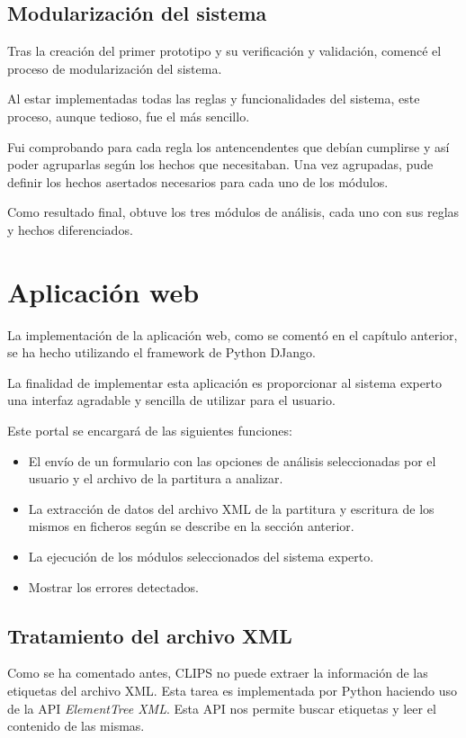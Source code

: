 \subsection{Modularización del sistema}

Tras la creación del primer prototipo y su verificación y validación, comencé el proceso de modularización del sistema. 

Al estar implementadas todas las reglas y funcionalidades del sistema, este proceso, aunque tedioso, fue el más sencillo. 

Fui comprobando para cada regla los antencendentes que debían cumplirse y así poder agruparlas según los hechos que necesitaban.
Una vez agrupadas, pude definir los hechos asertados necesarios para cada uno de los módulos.

Como resultado final, obtuve los tres módulos de análisis, cada uno con sus reglas y hechos diferenciados. 

\section{Aplicación web}

La implementación de la aplicación web, como se comentó en el capítulo anterior, se ha hecho utilizando el framework de Python DJango.

La finalidad de implementar esta aplicación es proporcionar al sistema experto una interfaz agradable y sencilla de utilizar para el usuario. 

Este portal se encargará de las siguientes funciones:
\begin{itemize} 
	\item El envío de un formulario con las opciones de análisis seleccionadas por el usuario y el archivo de la partitura a analizar.
	\item La extracción de datos del archivo XML de la partitura y escritura de los mismos en ficheros según se describe en la sección anterior.
	\item La ejecución de los módulos seleccionados del sistema experto.
	\item Mostrar los errores detectados.
\end{itemize}

\subsection{Tratamiento del archivo XML}

Como se ha comentado antes, CLIPS no puede extraer la información de las etiquetas del archivo XML. Esta tarea es implementada por Python haciendo uso de la API \textit{ElementTree XML}. Esta API nos permite buscar etiquetas y leer el contenido de las mismas. 

